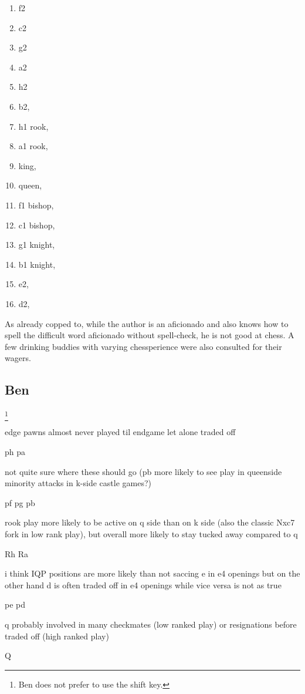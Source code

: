 \documentclass[twocolumn]{article}
\begin{document}
\begin{enumerate}
\item  f2
\item  c2
\item  g2
\item  a2
\item  h2
\item  b2,
\item  h1 rook,
\item  a1 rook,
\item  king,
\item  queen,
\item  f1 bishop,
\item  c1 bishop,
\item  g1 knight,
\item  b1 knight,
\item  e2,
\item  d2,
\end{enumerate}

As already copped to, while the author is an aficionado and also knows
how to spell the difficult word aficionado without spell-check, he is
not good at chess. A few drinking buddies with varying chessperience were
also consulted for their wagers.

\subsection{Ben}\footnote{Ben does not prefer to use the shift key.}

edge pawns almost never played til endgame let alone traded off

ph
pa

not quite sure where these should go (pb more likely to see play in
queenside minority attacks in k-side castle games?)

pf
pg
pb

rook play more likely to be active on q side than on k side (also the
classic Nxc7 fork in low rank play), but overall more likely to stay
tucked away compared to q

Rh
Ra

i think IQP positions are more likely than not saccing e in e4 openings
but on the other hand d is often traded off in e4 openings while vice
versa is not as true

pe
pd

q probably involved in many checkmates (low ranked play) or resignations
before traded off (high ranked play)

Q
\end{document}
